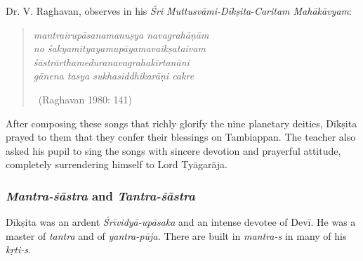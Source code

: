 Dr. V. Raghavan, observes in his \textit{Śri Muttusvāmi-Dīkṣita}-\textit{Caritam Mahā\-kāvyam}:

\vspace{-.2cm}

\begin{verse}
\textit{mantrairupāsanamanuṣya navagrahāṇām}\\ \textit{no śakyamityayamupāyamavaikṣataivam} \\ \textit{śāstrārthameduranavagrahakīrtanāni}\\ \textit{gānena tasya sukhasiddhikarāṇi cakre}  

~\hfill (Raghavan 1980: 141)
\end{verse}

After composing these songs that richly glorify the nine planetary deities, Dīkṣita prayed to them that they confer their blessings on Tambiappan. The teacher also asked his pupil to sing the songs with sincere devotion and prayerful attitude, completely surrendering himself to Lord Tyāgarāja.

\subsubsection*{\textit{Mantra-śāstra} and \textit{Tantra-śāstra}}

Dīkṣita was an ardent \textit{Śrīvidyā-upāsaka} and an intense devotee of Devī. He was a master of \textit{tantra} and of \textit{yantra-pūja.} There are built in \textit{mantra-s} in many of his \textit{kṛti-s}.

